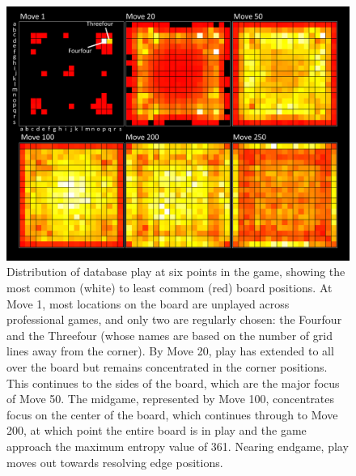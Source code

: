 \begin{figure}[t]
\begin{center} 
\includegraphics[scale=0.6]{figures/gofirstmove/figHeat.pdf}
\caption{Distribution of database play at six points in the game, showing the most common (white) to least commom (red) board positions.  At Move 1, most locations on the board are unplayed across professional games, and only two are regularly chosen: the Fourfour and the Threefour (whose names are based on the number of grid lines away from the corner).  By Move 20, play has extended to all over the board but remains concentrated in the corner positions.  This continues to the sides of the board, which are the major focus of Move 50.  The midgame, represented by Move 100, concentrates focus on the center of the board, which continues through to Move 200, at which point the entire board is in play and the game approach the maximum entropy value of 361.  Nearing endgame, play moves out towards resolving edge positions.}
\label{fig:Heat}
\end{center}
\end{figure}	
  
